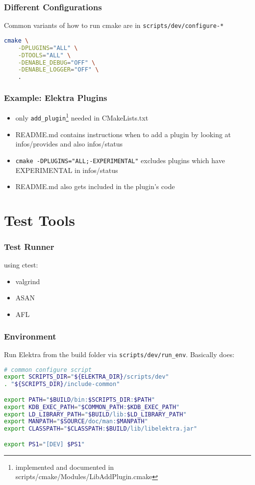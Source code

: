 \begin{frame}[fragile]
	\frametitle{Different Configurations}

	Common variants of how to run cmake are in \texttt{scripts/dev/configure-*}

	\begin{lstlisting}[language=sh]
cmake \
	-DPLUGINS="ALL" \
	-DTOOLS="ALL" \
	-DENABLE_DEBUG="OFF" \
	-DENABLE_LOGGER="OFF" \
	.\end{lstlisting}
\end{frame}

\begin{frame}
	\frametitle{Example: Elektra Plugins}

	\begin{itemize}[<+-| alert@+>]
	\item only \texttt{add_plugin}\footnote{implemented and documented in scripts/cmake/Modules/LibAddPlugin.cmake} needed in CMakeLists.txt
	\item README.md contains instructions when to add a plugin by looking at infos/provides and also infos/status
	\item \texttt{cmake -DPLUGINS="ALL;-EXPERIMENTAL"} excludes plugins which have EXPERIMENTAL in infos/status
	\item README.md also gets included in the plugin's code
	\end{itemize}
\end{frame}

\section{Test Tools}

\begin{frame}
	\frametitle{Test Runner}

	using ctest:

	\begin{itemize}
	\item valgrind
	\item ASAN
	\item AFL
	\end{itemize}
\end{frame}

\begin{frame}[fragile]
	\frametitle{Environment}

	Run Elektra from the build folder via \texttt{scripts/dev/run_env}.
	Basically does:

	\begin{lstlisting}[language=sh]
# common configure script
export SCRIPTS_DIR="${ELEKTRA_DIR}/scripts/dev"
. "${SCRIPTS_DIR}/include-common"

export PATH="$BUILD/bin:$SCRIPTS_DIR:$PATH"
export KDB_EXEC_PATH="$COMMON_PATH:$KDB_EXEC_PATH"
export LD_LIBRARY_PATH="$BUILD/lib:$LD_LIBRARY_PATH"
export MANPATH="$SOURCE/doc/man:$MANPATH"
export CLASSPATH="$CLASSPATH:$BUILD/lib/libelektra.jar"

export PS1="[DEV] $PS1"\end{lstlisting}
\end{frame}

